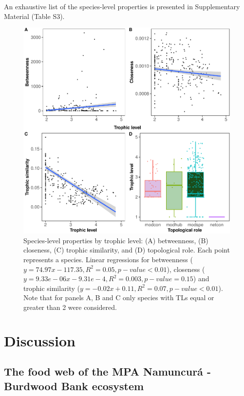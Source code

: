 \documentclass[preprint, 3p,
authoryear]{elsarticle} %
\begin{document}
An exhaustive list of the species-level properties is presented in
Supplementary Material (Table S3).

\begin{figure}

{\centering \includegraphics{MS_Burdwood_foodweb_files/figure-latex/figure4-1} 

}

\caption{Species-level properties by trophic level: (A) betweenness, (B) closeness, (C) trophic similarity, and (D) topological role. Each point represents a species. Linear regressions for betweenness ($y = 74.97x - 117.35, R^2 = 0.05, p-value < 0.01$), closeness ($y = 9.33e-06x - 9.31e-4, R^2 = 0.003, p-value = 0.15$) and trophic similarity ($y = -0.02x + 0.11 , R^2 = 0.07, p-value < 0.01$). Note that for panels A, B and C only species with TLs equal or greater than 2 were considered.}\label{fig:figure4}
\end{figure}

\hypertarget{discussion}{%
\section{Discussion}\label{discussion}}

\hypertarget{the-food-web-of-the-mpa-namuncuruxe1---burdwood-bank-ecosystem}{%
\subsection{The food web of the MPA Namuncurá - Burdwood Bank
ecosystem}\label{the-food-web-of-the-mpa-namuncuruxe1---burdwood-bank-ecosystem}}
\end{document}
